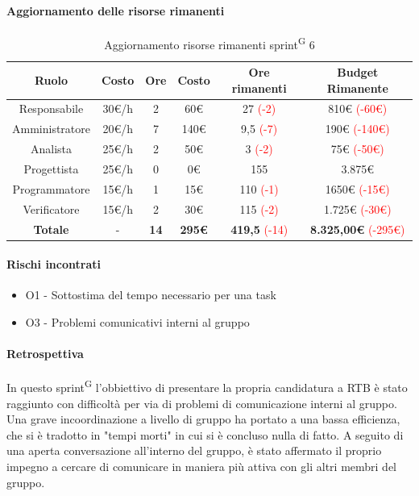 \documentclass[a4paper, 11pt]{article}
\newcommand{\subsubsubsection}[1]{\paragraph{#1}}
\renewcommand{\arraystretch}{1.4} %
\begin{document}
\subsubsubsection{Aggiornamento delle risorse rimanenti}
\begin{table}[H]
	\centering
	\renewcommand{\arraystretch}{1.5}
	
	\begin{tabular}{|c|c|c|c|c|c|}
		\hline
		\textcolor{AccentColor}{\textbf{Ruolo}} &
		\textcolor{AccentColor}{\textbf{Costo}} &
		\textcolor{AccentColor}{\textbf{Ore}} &
		\textcolor{AccentColor}{\textbf{Costo}} &
		\textcolor{AccentColor}{\textbf{Ore rimanenti}} &
		\textcolor{AccentColor}{\textbf{Budget Rimanente}} \\ \hline
		
		Responsabile & 30€/h & 2 & 60€ & 27 \textcolor{red}{(-2)} & 810€ \textcolor{red}{(-60€)}\\ \hline
		
		Amministratore & 20€/h & 7 & 140€ & 9,5 \textcolor{red}{(-7)} & 190€ \textcolor{red}{(-140€)} \\ \hline
		
		Analista & 25€/h & 2 & 50€ & 3 \textcolor{red}{(-2)} & 75€ \textcolor{red}{(-50€)}\\ \hline
		
		Progettista & 25€/h & 0 & 0€ & 155 & 3.875€\\ \hline
		
		Programmatore & 15€/h & 1 & 15€ & 110 \textcolor{red}{(-1)} & 1650€ \textcolor{red}{(-15€)} \\ \hline
		
		Verificatore & 15€/h & 2 & 30€ & 115 \textcolor{red}{(-2)}& 1.725€ \textcolor{red}{(-30€)} \\ \hline
		
		\textbf{Totale} & - & \textbf{14} & \textbf{295€} & \textbf{419,5} \textcolor{red}{(-14)} & \textbf{8.325,00€} \textcolor{red}{(-295€)}\\ \hline
	\end{tabular}
	\caption{Aggiornamento risorse rimanenti sprint\textsuperscript{G} 6}
\end{table}
\subsubsubsection{Rischi incontrati}
\begin{itemize}
	\item O1 - Sottostima del tempo necessario per una task
	\item O3 - Problemi comunicativi interni al gruppo
\end{itemize}
\subsubsubsection{Retrospettiva}
In questo sprint\textsuperscript{G} l'obbiettivo di presentare la propria candidatura a RTB è stato raggiunto con difficoltà per via di problemi di comunicazione interni al gruppo. Una grave incoordinazione a livello di gruppo ha portato a una bassa efficienza, che si è tradotto in "tempi morti" in cui si è concluso nulla di fatto. A seguito di una aperta conversazione all'interno del gruppo, è stato affermato il proprio impegno a cercare di comunicare in maniera più attiva con gli altri membri del gruppo.
\end{document}
